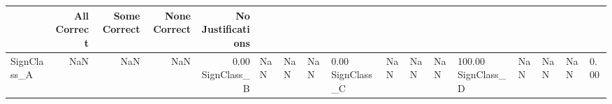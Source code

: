 \begin{tabular}{lrrrr}
\toprule
 & All Correct & Some Correct & None Correct & No Justifications \\
\midrule
SignClass_A & NaN & NaN & NaN & 0.00%
SignClass_B & NaN & NaN & NaN & 0.00%
SignClass_C & NaN & NaN & NaN & 100.00%
SignClass_D & NaN & NaN & NaN & 0.00%
\bottomrule
\end{tabular}

